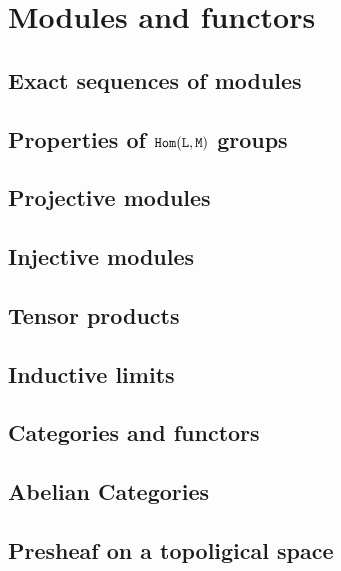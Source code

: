 \section{Modules and functors}
\label{section:I.1}

\subsection{Exact sequences of modules}
\label{subsection:I.1.1}

\subsection{Properties of $\mathtt{Hom}(\mathtt{L},\mathtt{M})$ groups}
\label{subsection:I.1.2}

\subsection{Projective modules}
\label{subsection:I.1.3}

\subsection{Injective modules}
\label{subsection:I.1.4}

\subsection{Tensor products}
\label{subsection:I.1.5}

\subsection{Inductive limits}
\label{subsection:I.1.6}

\subsection{Categories and functors}
\label{subsection:I.1.7}

\subsection{Abelian Categories}
\label{subsection:I.1.8}

\subsection{Presheaf on a topoligical space}
\label{subsection:I.1.9}